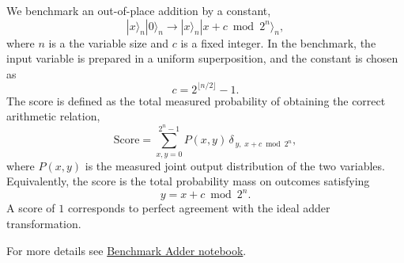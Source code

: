 We benchmark an out-of-place addition by a constant,
\[
|x\rangle_n |0\rangle_n \rightarrow |x\rangle_n |x+c \bmod{2^n}\rangle_n,
\]
where $n$ is a the variable size and \(c\) is a fixed integer. In the benchmark, the input variable is prepared in a uniform superposition, and the constant is chosen as
\[
c = 2^{\lfloor n/2 \rfloor} - 1.
\]
The score is defined as the total measured probability of obtaining the correct arithmetic relation,
\[
\mathrm{Score} =
\sum_{x,y=0}^{2^n-1} P(x,y)\,\delta_{\,y,\;x+c \bmod{2^n}},
\]
where \(P(x,y)\) is the measured joint output distribution of the two variables. Equivalently, the score is the total probability mass on outcomes satisfying
\[
y = x+c \bmod{2^n}.
\]
A score of \(1\) corresponds to perfect agreement with the ideal adder transformation.
\smallskip

For more details see \href{https://github.com/softqlib/softqlib-quantum-algorithms/tree/main/benchmarking/benchmarks/benchmark\_adder.ipynb}{Benchmark Adder notebook}.
\medskip
